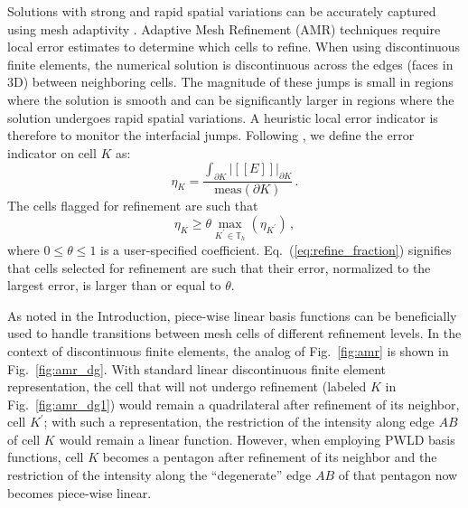 \documentclass[preprint,10pt]{elsarticle}
\newcommand{\jmp}[1]{[\![#1]\!]}                     %
\newcommand{\eqt}[1]{Eq.~(\ref{#1})}                     %
\newcommand{\fig}[1]{Fig.~\ref{#1}}                      %
\begin{document}
Solutions with strong and rapid spatial variations can be accurately captured using mesh adaptivity
\cite{Ainsworth2000}. Adaptive Mesh Refinement (AMR) techniques require local error estimates to determine
which cells to refine. When using discontinuous finite elements, the numerical solution is discontinuous
across the edges (faces in 3D) between neighboring cells. The magnitude of these jumps is 
small in regions where the solution is smooth and can be significantly larger in regions where
the solution undergoes rapid spatial variations. A heuristic local error indicator is therefore to
monitor the interfacial jumps. Following \cite{Leicht2008,Ragusa_Wang_JCP_2011}, we define 
the error indicator on cell $K$ as:
\begin{equation} \label{eq:error_indicator}
  \eta_K = \frac{\int_{\partial K} |\jmp{E}|_{\partial K}} {\text{meas}(\partial K)} \, .
\end{equation}  
%
The cells flagged for refinement are such that 
\begin{equation} \label{eq:refine_fraction}
  \eta_K \ge  \theta \max_{K^\prime \in \mathbb{T}_h} \left( \eta_{K^\prime} \right) \, ,
\end{equation}  
where $0 \le \theta \le 1$ is a user-specified coefficient. \eqt{eq:refine_fraction} signifies
that cells selected for refinement are such that their error, normalized to the largest error, 
is larger than or equal to $\theta$.

As noted in the Introduction, piece-wise linear basis functions can be beneficially used to handle transitions
between mesh cells of different refinement levels. In the context of discontinuous finite elements, the
analog of \fig{fig:amr} is shown in \fig{fig:amr_dg}. With standard linear discontinuous finite element representation, 
the cell that will not undergo refinement (labeled $K$ in \fig{fig:amr_dg1}) would remain a quadrilateral 
after refinement of its neighbor, cell $K^\prime$; with such a representation, the restriction of the intensity 
along edge $AB$ of cell $K$ would remain a linear function. However, when employing 
PWLD basis functions, cell $K$ becomes a pentagon after refinement of its neighbor and the 
restriction of the intensity along the ``degenerate'' edge $AB$ of that pentagon now becomes 
piece-wise linear.
\end{document}
